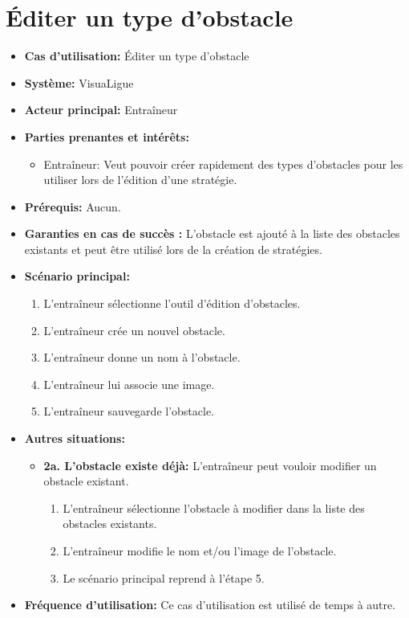 \section{Éditer un type d'obstacle}
\label{sec:editer_un_type_d_obstacle}

\begin{itemize}
    \item \textbf{Cas d'utilisation:} \'Editer un type d'obstacle
    \item \textbf{Syst\`eme:} VisuaLigue
    \item \textbf{Acteur principal:} Entra\^ineur
    \item \textbf{Parties prenantes et int\'er\^ets:}
        \begin{itemize}
            \item Entra\^ineur: Veut pouvoir cr\'eer rapidement des types d'obstacles pour les utiliser lors de l'\'edition d'une strat\'egie.
        \end{itemize}
    \item \textbf{Pr\'erequis:} Aucun.
    \item \textbf{Garanties en cas de succ\`es :} L'obstacle est ajout\'e \`a la liste des obstacles existants et peut \^etre utilis\'e lors de la cr\'eation de strat\'egies.
    \item \textbf{Sc\'enario principal:}
        \begin{enumerate}
        	\item L'entraîneur sélectionne l'outil d'édition d'obstacles.
        	\item L'entraîneur crée un nouvel obstacle.
            \item L'entra\^ineur donne un nom \`a l'obstacle.
            \item L'entra\^ineur lui associe une image.
            \item L'entra\^ineur sauvegarde l'obstacle.
        \end{enumerate}
    \item \textbf{Autres situations:} 
    	\begin{itemize}
    		\item \textbf{2a. L'obstacle existe déjà: } L'entraîneur peut vouloir modifier un obstacle existant.
    		\begin{enumerate}
    			\item L'entraîneur sélectionne l'obstacle à modifier dans la liste des obstacles existants.
    			\item L'entraîneur modifie le nom et/ou l'image de l'obstacle.
    			\item Le scénario principal reprend à l'étape 5.
    		\end{enumerate}
    	\end{itemize}
    \item \textbf{Fréquence d'utilisation:} Ce cas d'utilisation est utilis\'e de temps \`a autre.
\end{itemize}



